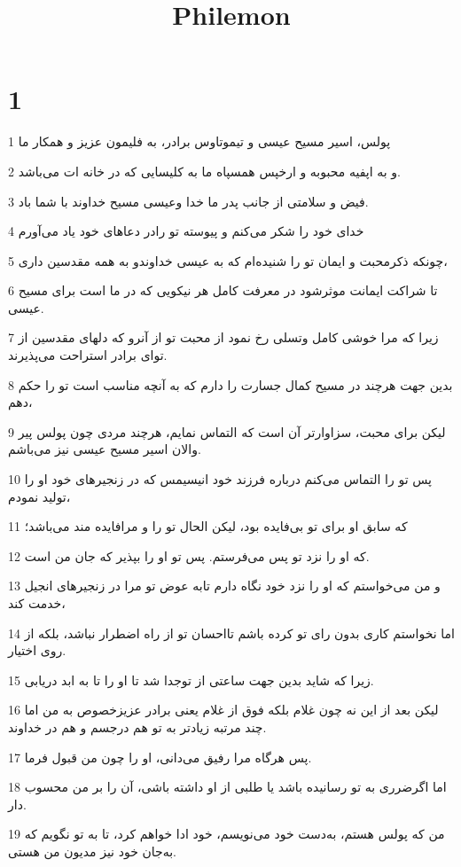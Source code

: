 

\title{Philemon}


\chapter{1}

\par 1 پولس، اسیر مسیح عیسی و تیموتاوس برادر، به فلیمون عزیز و همکار ما
\par 2 و به اپفیه محبوبه و ارخپس همسپاه ما به کلیسایی که در خانه ات می‌باشد.
\par 3 فیض و سلامتی از جانب پدر ما خدا وعیسی مسیح خداوند با شما باد.
\par 4 خدای خود را شکر می‌کنم و پیوسته تو رادر دعاهای خود یاد می‌آورم
\par 5 چونکه ذکرمحبت و ایمان تو را شنیده‌ام که به عیسی خداوندو به همه مقدسین داری،
\par 6 تا شراکت ایمانت موثرشود در معرفت کامل هر نیکویی که در ما است برای مسیح عیسی.
\par 7 زیرا که مرا خوشی کامل وتسلی رخ نمود از محبت تو از آنرو که دلهای مقدسین از تو‌ای برادر استراحت می‌پذیرند.
\par 8 بدین جهت هرچند در مسیح کمال جسارت را دارم که به آنچه مناسب است تو را حکم دهم،
\par 9 لیکن برای محبت، سزاوارتر آن است که التماس نمایم، هرچند مردی چون پولس پیر والان اسیر مسیح عیسی نیز می‌باشم.
\par 10 پس تو را التماس می‌کنم درباره فرزند خود انیسیمس که در زنجیرهای خود او را تولید نمودم،
\par 11 که سابق او برای تو بی‌فایده بود، لیکن الحال تو را و مرافایده مند می‌باشد؛
\par 12 که او را نزد تو پس می‌فرستم. پس تو او را بپذیر که جان من است.
\par 13 و من می‌خواستم که او را نزد خود نگاه دارم تابه عوض تو مرا در زنجیرهای انجیل خدمت کند،
\par 14 اما نخواستم کاری بدون رای تو کرده باشم تااحسان تو از راه اضطرار نباشد، بلکه از روی اختیار.
\par 15 زیرا که شاید بدین جهت ساعتی از توجدا شد تا او را تا به ابد دریابی.
\par 16 لیکن بعد از این نه چون غلام بلکه فوق از غلام یعنی برادر عزیزخصوص به من اما چند مرتبه زیادتر به تو هم درجسم و هم در خداوند.
\par 17 پس هرگاه مرا رفیق می‌دانی، او را چون من قبول فرما.
\par 18 اما اگرضرری به تو رسانیده باشد یا طلبی از او داشته باشی، آن را بر من محسوب دار.
\par 19 من که پولس هستم، به‌دست خود می‌نویسم، خود ادا خواهم کرد، تا به تو نگویم که به‌جان خود نیز مدیون من هستی.
